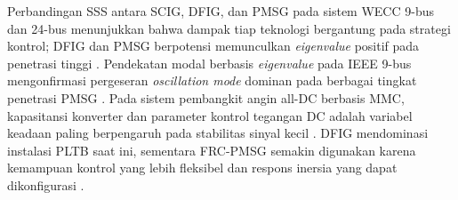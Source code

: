 Perbandingan SSS antara SCIG, DFIG, dan PMSG pada sistem WECC 9-bus dan 24-bus
menunjukkan bahwa dampak tiap teknologi bergantung pada strategi kontrol; DFIG dan
PMSG berpotensi memunculkan \textit{eigenvalue} positif pada penetrasi tinggi
\cite{he2015investigation}. Pendekatan modal berbasis \textit{eigenvalue} pada IEEE
9-bus mengonfirmasi pergeseran \textit{oscillation mode} dominan pada berbagai
tingkat penetrasi PMSG \cite{wang2014small}. Pada sistem pembangkit angin all-DC
berbasis MMC, kapasitansi konverter dan parameter kontrol tegangan DC adalah
variabel keadaan paling berpengaruh pada stabilitas sinyal kecil \cite{jin2024analysis}.
DFIG mendominasi instalasi PLTB saat ini, sementara FRC-PMSG semakin digunakan
karena kemampuan kontrol yang lebih fleksibel dan respons inersia yang dapat
dikonfigurasi \cite{mostafa2023recent}.

